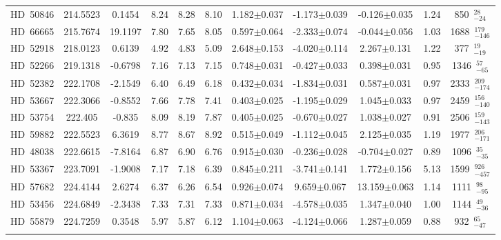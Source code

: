 {\begin{longtable}{lcccccccccc}
\noalign{\smallskip}
HD~50846 & 214.5523 & 0.1454 & 8.24 & 8.28 & 8.10 & 1.182$\pm$0.037 & -1.173$\pm$0.039 & -0.126$\pm$0.035 & 1.24 & 850~$_{-24}^{28}$ \\
\noalign{\smallskip}
HD~66665 & 215.7674 & 19.1197 & 7.80 & 7.65 & 8.05 & 0.597$\pm$0.064 & -2.333$\pm$0.074 & -0.044$\pm$0.056 & 1.03 & 1688~$_{-146}^{179}$ \\
\noalign{\smallskip}
HD~52918 & 218.0123 & 0.6139 & 4.92 & 4.83 & 5.09 & 2.648$\pm$0.153 & -4.020$\pm$0.114 & 2.267$\pm$0.131 & 1.22 & 377~$_{-19}^{19}$ \\
\noalign{\smallskip}
HD~52266 & 219.1318 & -0.6798 & 7.16 & 7.13 & 7.15 & 0.748$\pm$0.031 & -0.427$\pm$0.033 & 0.398$\pm$0.031 & 0.95 & 1346~$_{-65}^{57}$ \\
\noalign{\smallskip}
HD~52382 & 222.1708 & -2.1549 & 6.40 & 6.49 & 6.18 & 0.432$\pm$0.034 & -1.834$\pm$0.031 & 0.587$\pm$0.031 & 0.97 & 2333~$_{-174}^{209}$ \\
\noalign{\smallskip}
HD~53667 & 222.3066 & -0.8552 & 7.66 & 7.78 & 7.41 & 0.403$\pm$0.025 & -1.195$\pm$0.029 & 1.045$\pm$0.033 & 0.97 & 2459~$_{-140}^{156}$ \\
\noalign{\smallskip}
HD~53754 & 222.405 & -0.835 & 8.09 & 8.19 & 7.87 & 0.405$\pm$0.025 & -0.670$\pm$0.027 & 1.038$\pm$0.027 & 0.91 & 2506~$_{-143}^{159}$ \\
\noalign{\smallskip}
HD~59882 & 222.5523 & 6.3619 & 8.77 & 8.67 & 8.92 & 0.515$\pm$0.049 & -1.112$\pm$0.045 & 2.125$\pm$0.035 & 1.19 & 1977~$_{-171}^{206}$ \\
\noalign{\smallskip}
HD~48038 & 222.6615 & -7.8164 & 6.87 & 6.90 & 6.76 & 0.915$\pm$0.030 & -0.236$\pm$0.028 & -0.704$\pm$0.027 & 0.89 & 1096~$_{-35}^{35}$ \\
\noalign{\smallskip}
HD~53367 & 223.7091 & -1.9008 & 7.17 & 7.18 & 6.39 & 0.845$\pm$0.211 & -3.741$\pm$0.141 & 1.772$\pm$0.156 & 5.13 & 1599~$_{-457}^{926}$ \\
\noalign{\smallskip}
HD~57682 & 224.4144 & 2.6274 & 6.37 & 6.26 & 6.54 & 0.926$\pm$0.074 & 9.659$\pm$0.067 & 13.159$\pm$0.063 & 1.14 & 1111~$_{-95}^{98}$ \\
\noalign{\smallskip}
HD~53456 & 224.6849 & -2.3438 & 7.33 & 7.31 & 7.33 & 0.871$\pm$0.034 & -4.578$\pm$0.035 & 1.347$\pm$0.040 & 1.00 & 1144~$_{-36}^{49}$ \\
\noalign{\smallskip}
HD~55879 & 224.7259 & 0.3548 & 5.97 & 5.87 & 6.12 & 1.104$\pm$0.063 & -4.124$\pm$0.066 & 1.287$\pm$0.059 & 0.88 & 932~$_{-47}^{65}$ \\
\noalign{\smallskip}

\end{longtable}}
